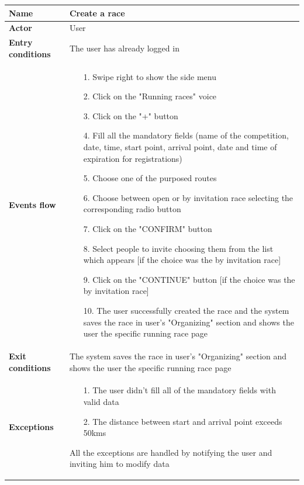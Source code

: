\begin{table}[]
\begin{adjustbox}{width=\textwidth}
\footnotesize
\begin{tabular}{|p{}|p{}|}
\hline
\textbf{Name}             &  Create a race\\ \hline
\textbf{Actor}            &  User\\ \hline
\textbf{Entry conditions} &  The user has already logged in\\ \hline
\textbf{Events flow}      &
	\begin{itemize}
		\item[1.] Swipe right to show the side menu
		\item[2.] Click on the "Running races" voice
		\item[3.] Click on the "+" button
		\item[4.] Fill all the mandatory fields (name of the competition, date, time, start point, arrival point, date and time of expiration for registrations)
		\item[5.] Choose one of the purposed routes
		\item[6.] Choose between open or by invitation race selecting the corresponding radio button
		\item[7.] Click on the "CONFIRM" button
		\item[8.] Select people to invite choosing them from the list which appears [if the choice was the by invitation race]
		\item[9.] Click on the "CONTINUE" button [if the choice was the by invitation race]
		\item[10.] The user successfully created the race and the system saves the race in user's "Organizing" section and shows the user the specific running race page
	\end{itemize}\\ \hline
\textbf{Exit conditions}  &  The system saves the race in user's "Organizing" section and shows the user the specific running race page\\ \hline
\textbf{Exceptions}       &
	\begin{itemize}
		\item[1.] The user didn’t fill all of the mandatory fields with valid data
		\item[2.] The distance between start and arrival point exceeds 50kms
	\end{itemize}
	All the exceptions are handled by notifying the user and inviting him to modify data\\ \hline
\end{tabular}
\end{adjustbox}
\end{table}

